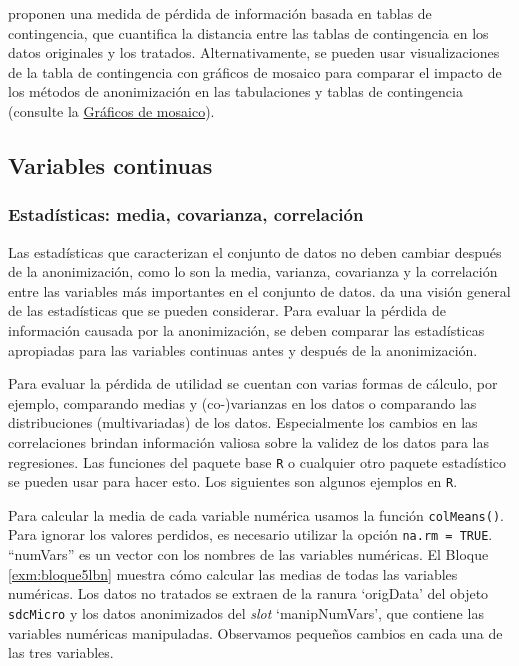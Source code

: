 \documentclass[]{book}
\theoremstyle{definition}
\theoremstyle{definition}
\theoremstyle{definition}
\theoremstyle{definition}
\theoremstyle{remark}
\begin{document}
\citep{domingo-ferrer2001}proponen una medida de pérdida de información basada en tablas de contingencia, que cuantifica la distancia entre las tablas de contingencia en los datos originales y los tratados.
Alternativamente, se pueden usar visualizaciones de la tabla de contingencia con gráficos de mosaico para comparar el impacto de los métodos de anonimización en las tabulaciones y tablas de contingencia (consulte la \protect\hyperlink{gruxe1ficos-de-mosaico}{Gráficos de mosaico}).

\hypertarget{variables-continuas}{%
\subsection{Variables continuas}\label{variables-continuas}}

\hypertarget{estaduxedsticas-media-covarianza-correlaciuxf3n}{%
\subsubsection{Estadísticas: media, covarianza, correlación}\label{estaduxedsticas-media-covarianza-correlaciuxf3n}}

Las estadísticas que caracterizan el conjunto de datos no deben cambiar después de la anonimización, como lo son la media, varianza, covarianza y la correlación entre las variables más importantes en el conjunto de
datos. \citep{domingo-ferrer2001} da una visión general de las estadísticas que se pueden considerar. Para evaluar la pérdida de información causada por la anonimización, se deben comparar las estadísticas apropiadas para las variables continuas antes y después de la anonimización.

Para evaluar la pérdida de utilidad se cuentan con varias formas de cálculo, por ejemplo, comparando medias y (co-)varianzas en los datos o comparando las distribuciones (multivariadas) de los datos. Especialmente los cambios en las correlaciones brindan información valiosa sobre la validez de los datos para las regresiones. Las
funciones del paquete base \texttt{R} o cualquier otro paquete estadístico se pueden usar para hacer esto. Los siguientes son algunos ejemplos en \texttt{R}.

Para calcular la media de cada variable numérica usamos la función \texttt{colMeans()}. Para ignorar los valores perdidos, es necesario utilizar la opción \texttt{na.rm\ =\ TRUE}. ``numVars'' es un vector con los nombres de las variables numéricas. El Bloque \ref{exm:bloque5lbn} muestra cómo calcular las medias de todas las variables numéricas. Los datos no tratados se extraen de la ranura `origData' del objeto \texttt{sdcMicro} y los datos anonimizados del \emph{slot} `manipNumVars', que contiene las variables numéricas manipuladas. Observamos pequeños cambios en cada una de las tres variables.
\end{document}
